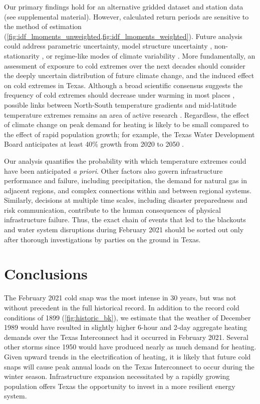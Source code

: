 \documentclass[12pt]{iopart}
\begin{document}
Our primary findings hold for an alternative gridded dataset and station data (see supplemental material).
However, calculated return periods are sensitive to the method of estimation (\cref{fig:idf_lmoments_unweighted,fig:idf_lmoments_weighted}).
Future analysis could address parametric uncertainty, model structure uncertainty \cite{wong_floodrisk:2018}, non-stationarity \cite{Milly:2008dg}, or regime-like modes of climate variability \cite{DossGollin:2019}.
More fundamentally, an assessment of exposure to cold extremes over the next decades should consider the deeply uncertain distribution of future climate change, and the induced effect on cold extremes in Texas.
Although a broad scientific consensus suggests the frequency of cold extremes should decrease under warming in most places \cite{ipcc_ar5:2014}, possible links between North-South temperature gradients and mid-latitude temperature extremes remains an area of active research \cite{Barnes:2013fp,Cohen:2014gx,Screen:2013ho}.
Regardless, the effect of climate change on peak demand for heating is likely to be small compared to the effect of rapid population growth; for example, the Texas Water Development Board anticipates at least 40\% growth from 2020 to 2050 \cite{texaswaterplan:2012}.

Our analysis quantifies the probability with which temperature extremes could have been anticipated \emph{a priori}.
Other factors also govern infrastructure performance and failure, including precipitation, the demand for natural gas in adjacent regions, and complex connections within and between regional systems.
Similarly, decisions at multiple time scales, including disaster preparedness and risk communication, contribute to the human consequences of physical infrastructure failure.
Thus, the exact chain of events that led to the blackouts and water system disruptions during February 2021 should be sorted out only after thorough investigations by parties on the ground in Texas.

\section{Conclusions}

The February 2021 cold snap was the most intense in 30 years, but was not without precedent in the full historical record.
In addition to the record cold conditions of 1899 (\cref{fig:historic_bk}), we estimate that the weather of December 1989 would have resulted in slightly higher 6-hour and 2-day aggregate heating demands over the Texas Interconnect had it occurred in February 2021.
Several other storms since 1950 would have produced nearly as much demand for heating.
Given upward trends in the electrification of heating, it is likely that future cold snaps will cause peak annual loads on the Texas Interconnect to occur during the winter season.
Infrastructure expansion necessitated by a rapidly growing population offers Texas the opportunity to invest in a more resilient energy system.
\end{document}
